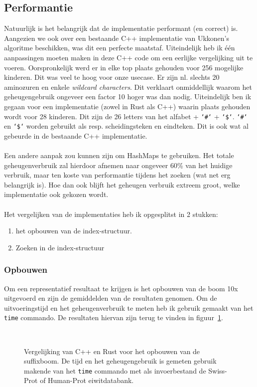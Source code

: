 \subsection{Performantie}\label{subsec:performantie}
Natuurlijk is het belangrijk dat de implementatie performant (en correct) is.
Aangezien we ook over een bestaande C++ implementatie van Ukkonen's algoritme beschikken, was dit een perfecte maatstaf.
Uiteindelijk heb ik één aanpassingen moeten maken in deze C++ code om een eerlijke vergelijking uit te voeren.
Oorspronkelijk werd er in elke top plaats gehouden voor 256 mogelijke kinderen.
Dit was veel te hoog voor onze usecase.
Er zijn nl. slechts 20 aminozuren en enkele \textit{wildcard characters}.
Dit verklaart onmiddellijk waarom het geheugengebruik ongeveer een factor 10 hoger was dan nodig.
Uiteindelijk ben ik gegaan voor een implementatie (zowel in Rust als C++) waarin plaats gehouden wordt voor 28 kinderen.
Dit zijn de 26 letters van het alfabet + \texttt{`\#`} + \texttt{`\$`}.
\texttt{`\#`} en \texttt{`\$`} worden gebruikt als resp. scheidingsteken en eindteken.
Dit is ook wat al gebeurde in de bestaande C++ implementatie.
\\ \\
Een andere aanpak zou kunnen zijn om HashMaps te gebruiken.
Het totale geheugenverbruik zal hierdoor afnemen naar ongeveer 60\% van het huidige verbruik, maar ten koste van performantie tijdens het zoeken (wat net erg belangrijk is).
Hoe dan ook blijft het geheugen verbruik extreem groot, welke implementatie ook gekozen wordt.
\\ \\
Het vergelijken van de implementaties heb ik opgesplitst in 2 stukken:
\begin{enumerate}
    \item het opbouwen van de index-structuur.
    \item Zoeken in de index-structuur
\end{enumerate}

\subsubsection{Opbouwen}
Om een representatief resultaat te krijgen is het opbouwen van de boom 10x uitgevoerd en zijn de gemiddelden van de resultaten genomen.
Om de uitvoeringstijd en het geheugenverbruik te meten heb ik gebruik gemaakt van het \texttt{time} commando.
De resultaten hiervan zijn terug te vinden in figuur~\ref{fig:tree_building}.
\begin{figure}[H]
    \centering
    \\[4ex] %

    \caption{Vergelijking van C++ en Rust voor het opbouwen van de suffixboom. De tijd en het geheugengebruik is gemeten gebruik makende van het \texttt{time} commando met als invoerbestand de Swiss-Prot of Human-Prot eiwitdatabank.}\label{fig:tree_building}
\end{figure}


